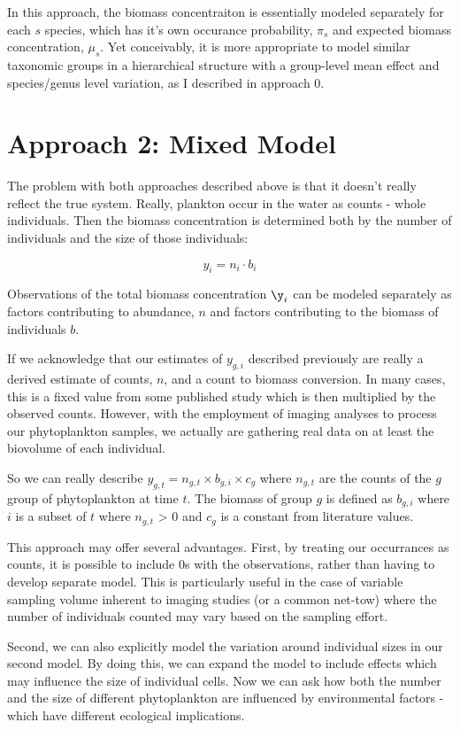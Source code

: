\documentclass[
  letterpaper,
  DIV=11,
  numbers=noendperiod]{scrartcl}
\begin{document}
In this approach, the biomass concentraiton is essentially modeled
separately for each \(s\) species, which has it's own occurance
probability, \(\pi_s\) and expected biomass concentration, \(\mu_s\).
Yet conceivably, it is more appropriate to model similar taxonomic
groups in a hierarchical structure with a group-level mean effect and
species/genus level variation, as I described in approach 0.

\section{Approach 2: Mixed Model}\label{approach-2-mixed-model}

The problem with both approaches described above is that it doesn't
really reflect the true system. Really, plankton occur in the water as
counts - whole individuals. Then the biomass concentration is determined
both by the number of individuals and the size of those individuals:

\[
y_i = n_i \cdot b_i
\]

Observations of the total biomass concentration \(\y_i\) can be modeled
separately as factors contributing to abundance, \(n\) and factors
contributing to the biomass of individuals \(b\).

If we acknowledge that our estimates of \(y_{g,i}\) described previously
are really a derived estimate of counts, \(n\), and a count to biomass
conversion. In many cases, this is a fixed value from some published
study which is then multiplied by the observed counts. However, with the
employment of imaging analyses to process our phytoplankton samples, we
actually are gathering real data on at least the biovolume of each
individual.

So we can really describe
\(y_{g,t} = n_{g,t} \times b_{g,i} \times c_g\) where \(n_{g,t}\) are
the counts of the \(g\) group of phytoplankton at time \(t\). The
biomass of group \(g\) is defined as \(b_{g,i}\) where \(i\) is a subset
of \(t\) where \(n_{g,t}\) \textgreater{} 0 and \(c_g\) is a constant
from literature values.

This approach may offer several advantages. First, by treating our
occurrances as counts, it is possible to include 0s with the
observations, rather than having to develop separate model. This is
particularly useful in the case of variable sampling volume inherent to
imaging studies (or a common net-tow) where the number of individuals
counted may vary based on the sampling effort.

Second, we can also explicitly model the variation around individual
sizes in our second model. By doing this, we can expand the model to
include effects which may influence the size of individual cells. Now we
can ask how both the number and the size of different phytoplankton are
influenced by environmental factors - which have different ecological
implications.
\end{document}
